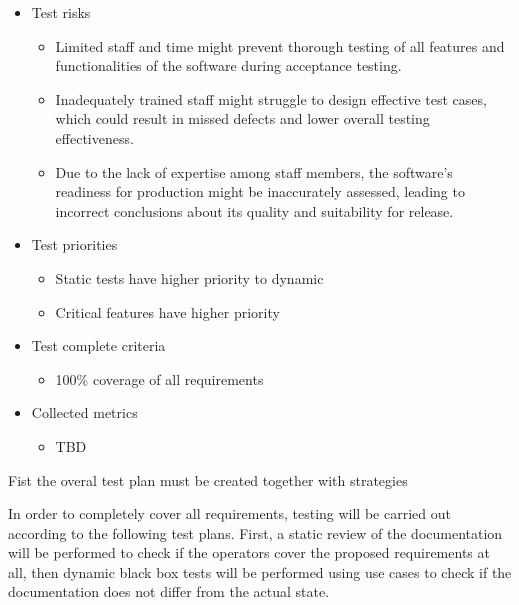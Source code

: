 \begin{itemize}
    \item Test risks
          \begin{itemize}
              \item Limited staff and time might prevent thorough testing of all features and functionalities of the software during acceptance testing.
              \item	Inadequately trained staff might struggle to design effective test cases, which could result in missed defects and lower overall testing effectiveness.
              \item	Due to the lack of expertise among staff members, the software's readiness for production might be inaccurately assessed, leading to incorrect conclusions about its quality and suitability for release.
          \end{itemize}
    \item Test priorities
          \begin{itemize}
              \item Static tests have higher priority to dynamic
              \item Critical features have higher priority
          \end{itemize}

    \item Test complete criteria
          \begin{itemize}
              \item 100\% coverage of all requirements
          \end{itemize}

    \item Collected metrics
          \begin{itemize}
              \item TBD
          \end{itemize}
\end{itemize}







Fist the overal test plan must be created together with strategies



In order to completely cover all requirements, testing will be carried out according to the following test plans. First, a static review of the documentation will be performed to check if the operators cover the proposed requirements at all, then dynamic black box tests will be performed using use cases to check if the documentation does not differ from the actual state.


